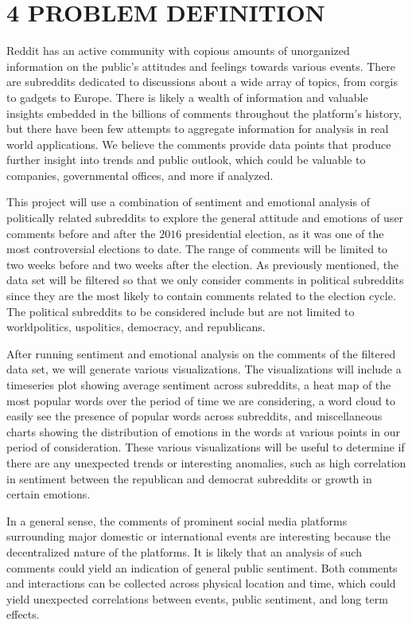 \documentclass[letterpaper]{article}
\begin{document}
\section{4 PROBLEM DEFINITION}

Reddit has an active community with copious amounts of unorganized information on the public's attitudes and feelings towards various events. There are subreddits dedicated to discussions about a wide array of topics, from corgis to gadgets to Europe. There is likely a wealth of information and valuable insights embedded in the billions of comments throughout the platform's history, but there have been few attempts to aggregate information for analysis in real world applications. We believe the comments provide data points that produce further insight into trends and public outlook, which could be valuable to companies, governmental offices, and more if analyzed.

This project will use a combination of sentiment and emotional analysis of politically related subreddits to explore the general attitude and emotions of user comments before and after the $2016$ presidential election, as it was one of the most controversial elections to date. The range of comments will be limited to two weeks before and two weeks after the election. As previously mentioned, the data set will be filtered so that we only consider comments in political subreddits since they are the most likely to contain comments related to the election cycle. The political subreddits to be considered include but are not limited to worldpolitics, uspolitics, democracy, and republicans.

After running sentiment and emotional analysis on the comments of the filtered data set, we will generate various visualizations. The visualizations will include a timeseries plot showing average sentiment across subreddits, a heat map of the most popular words over the period of time we are considering, a word cloud to easily see the presence of popular words across subreddits, and miscellaneous charts showing the distribution of emotions in the words at various points in our period of consideration. These various visualizations will be useful to determine if there are any unexpected trends or interesting anomalies, such as high correlation in sentiment between the republican and democrat subreddits or growth in certain emotions.

In a general sense, the comments of prominent social media platforms surrounding major domestic or international events are interesting because the decentralized nature of the platforms. It is likely that an analysis of such comments could yield an indication of general public sentiment. Both comments and interactions can be collected across physical location and time, which could yield unexpected correlations between events, public sentiment, and long term effects.
\end{document}
